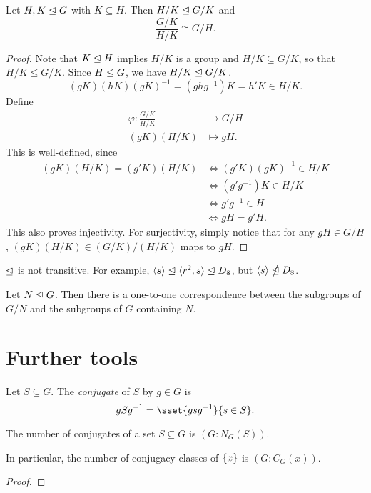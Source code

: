
\begin{theorem*} \label{thm:iso:3}
    Let $H, K \trianglelefteq G$ with $K \subseteq H$.
    Then $H/K \trianglelefteq G/K$ and \[
        \frac{G/K}{H/K} \cong G/H.
    \]
\end{theorem*}
\begin{proof}
    Note that $K \trianglelefteq H$ implies $H/K$ is a group and
    $H/K \subseteq G/K$, so that $H/K \le G/K$.
    Since $H \trianglelefteq G$, we have $H/K \trianglelefteq G/K$. \[
        (gK)(hK)(gK)^{-1} = (ghg^{-1})K = h'K \in H/K.
    \]
    Define \begin{align*}
        \varphi\colon \frac{G/K}{H/K} &\to G/H \\
        (gK)(H/K) &\mapsto gH.
    \end{align*}
    This is well-defined, since \begin{align*}
        (gK)(H/K) = (g'K)(H/K) &\iff (g'K)(gK)^{-1} \in H/K \\
            &\iff (g'g^{-1})K \in H/K \\
            &\iff g'g^{-1} \in H \\
            &\iff gH = g'H.
    \end{align*}
    This also proves injectivity.
    For surjectivity, simply notice that for any $gH \in G/H$,
    $(gK)(H/K) \in (G/K)/(H/K)$ maps to $gH$.
\end{proof}
\begin{remark}
    $\trianglelefteq$ is not transitive.
    For example, $\langle s\rangle \trianglelefteq \langle r^2, s\rangle \trianglelefteq D_8$,
    but $\langle s\rangle \ntrianglelefteq D_8$.
\end{remark}

\begin{theorem} \label{thm:iso:4}
    Let $N \trianglelefteq G$.
    Then there is a one-to-one correspondence between the subgroups of
    $G/N$ and the subgroups of $G$ containing $N$.
\end{theorem}

\section{Further tools} \label{sec:tools}
\begin{definition}[conjugate] \label{def:conjugate}
    Let $S \subseteq G$.
    The \emph{conjugate} of $S$ by $g \in G$ is \[
        gSg^{-1} = \sset{gsg^{-1}}{s \in S}.
    \]
\end{definition}
\begin{proposition*} \label{thm:tools:class}
    The number of conjugates of a set $S \subseteq G$ is $(G : N_G(S))$.

    In particular, the number of conjugacy classes of
    $\{x\}$ is $(G : C_G(x))$.
\end{proposition*}
\begin{proof}
    
\end{proof}
